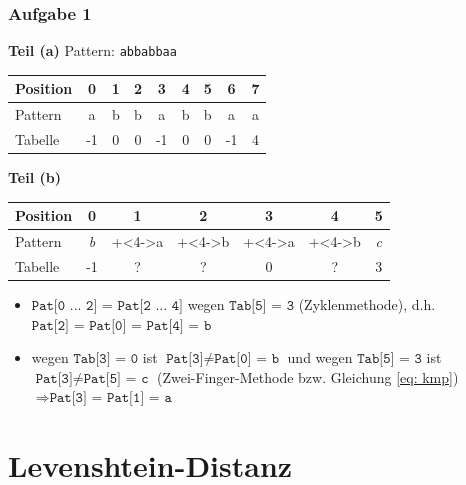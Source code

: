 \documentclass{beamer}
\begin{document}
\begin{frame} \frametitle{Aufgabe 1}
	\textbf{Teil (a)} \hspace{3em}
	Pattern: {\large \texttt{abbabbaa}} \\[1em]
	\pause
	
	\begin{center}
		\begin{tabular}{l|cccccccc}
			Position &  0 &  1 &  2 &  3 &  4 &  5 &  6 &  7  \\ \hline
			Pattern  &  a &  b &  b &  a &  b &  b &  a &  a  \\ \hline
			Tabelle  & -1 &  0 &  0 & -1 &  0 &  0 & -1 &  4  \\
		\end{tabular}
	\end{center}
	
	\pause

	\textbf{Teil (b)}
	\begin{center}
		\begin{tabular}{l|cccccc}
			Position &  0 &  1 &  2 &  3 &  4 &  5 \\ \hline
			Pattern  &  \textit{b} &  \onslide+<4->{a} &  \onslide+<4->{b} &  \onslide+<4->{a} &  \onslide+<4->{b} &  \textit{c} \\ \hline
			Tabelle  & -1 &  ? & ? &  0 &  ? &  3 \\
		\end{tabular}
	\end{center}

	\pause

	\footnotesize
	\begin{itemize}
		\item $\texttt{Pat[0 ... 2] = Pat[2 ... 4]}$ wegen $\texttt{Tab[5] = 3}$ (Zyklenmethode), d.h. $\texttt{Pat[2] = Pat[0] = Pat[4] = b}$
		\item wegen $\texttt{Tab[3] = 0}$ ist $\texttt{Pat[3]} \neq  \texttt{Pat[0] = b}$ und wegen $\texttt{Tab[5] = 3}$ ist $\texttt{Pat[3]} \neq \texttt{Pat[5] = c}$ (Zwei-Finger-Methode bzw. Gleichung \eqref{eq: kmp}) \\
		$\Rightarrow \texttt{Pat[3] = Pat[1] = a}$
	\end{itemize}
	
\end{frame}


\section{Levenshtein-Distanz}
\end{document}
